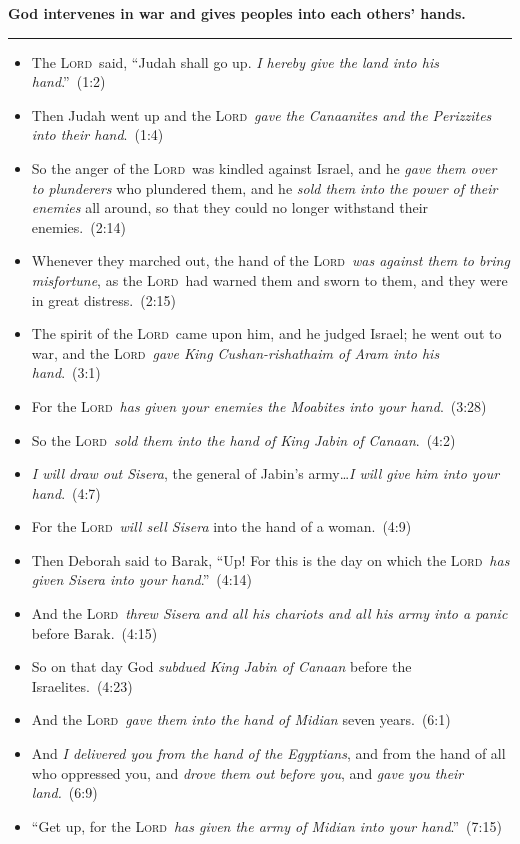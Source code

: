 \documentclass{article}
\newcommand{\godcategory}[1]{\bigskip\noindent \textbf{#1}\smallskip\hrule\nopagebreak}
\newcommand{\Lord}{\textsc{Lord}}
\newcommand{\elips}{\thinspace\ldots}
\begin{document}
\begin{landscape}
\begin{multicols}{3}
\godcategory{God intervenes in war and gives peoples into each others' hands.}
\begin{itemize}
  \item The \Lord\ said, “Judah shall go up. \emph{I hereby give the land into his hand}.”~(1:2)
  \item Then Judah went up and the \Lord\ \emph{gave the Canaanites and the Perizzites into their hand}.~(1:4)
  \item So the anger of the \Lord\ was kindled against Israel, and he \emph{gave them over to plunderers} who plundered them, and he \emph{sold them into the power of their enemies} all around, so that they could no longer withstand their enemies.~(2:14)
  \item Whenever they marched out, the hand of the \Lord\ \emph{was against them to bring misfortune}, as the \Lord\ had warned them and sworn to them, and they were in great distress.~(2:15)
  \item The spirit of the \Lord\ came upon him, and he judged Israel; he went out to war, and the \Lord\ \emph{gave King Cushan-rishathaim of Aram into his hand}.~(3:1)
  \item For the \Lord\ \emph{has given your enemies the Moabites into your hand}.~(3:28)
  \item So the \Lord\ \emph{sold them into the hand of King Jabin of Canaan}.~(4:2)
  \item \emph{I will draw out Sisera}, the general of Jabin’s army\elips \emph{I will give him into your hand}.~(4:7)
  \item For the \Lord\ \emph{will sell Sisera} into the hand of a woman.~(4:9)
  \item Then Deborah said to Barak, “Up! For this is the day on which the \Lord\ \emph{has given Sisera into your hand}.''~(4:14)
  \item And the \Lord\ \emph{threw Sisera and all his chariots and all his army into a panic} before Barak.~(4:15)
  \item So on that day God \emph{subdued King Jabin of Canaan} before the Israelites.~(4:23)
  \item And the \Lord\ \emph{gave them into the hand of Midian} seven years.~(6:1)
  \item And \emph{I delivered you from the hand of the Egyptians}, and from the hand of all who oppressed you, and \emph{drove them out before you}, and \emph{gave you their land.}~(6:9)
  \item “Get up, for the \Lord\ \emph{has given the army of Midian into your hand}.”~(7:15)

\end{itemize}
\end{multicols}
\end{landscape}
\end{document}
